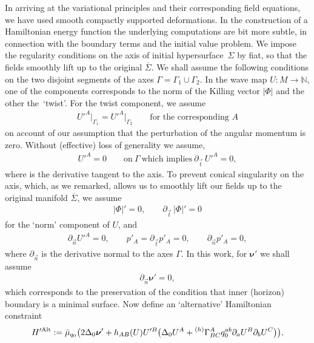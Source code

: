 \documentclass[11pt]{article}
\numberwithin{equation}{section}
\def\ptl{\partial}%
\def\mbo#1{\boldsymbol{#1}}%
\def\olin#1{\overline{#1}{}}%
\newcommand{\leftexp}[2]{{\vphantom{#2}}^{#1}{#2}}
\numberwithin{equation}{section}
\begin{document}
In arriving at the variational principles and their corresponding field equations, we have used smooth compactly supported deformations. In the construction of a Hamiltonian energy function the underlying computations are bit more subtle, in connection with the boundary terms and the initial value problem. We impose the regularity conditions on the axis of initial hypersurface~$\Sigma$ by fiat, so that the fields smoothly lift up to the original $\olin{\Sigma}$. We shall assume the following conditions on the two disjoint segments of the axes $\Gamma = \Gamma_1 \cup \Gamma_2$. In the wave map $U \colon M \to \mathbb{N}$, one of the components corresponds to the norm of the Killing vector $\vert \Phi \vert$ and the other the~`twist'. For the twist component, we assume
\begin{align*}
U'^A\big\vert_{\Gamma_1} = U'^A \big\vert_{\Gamma_2} \qquad \text{for the corresponding $A$}
\end{align*}
on account of our assumption that the perturbation of the angular momentum is zero. Without (effective) loss of generality we assume,
\begin{align*}
U'^A = 0 \qquad \text{on} \ \Gamma \ \text{which implies} \ \ptl_{\vec{t}}\, U'^A=0,
\end{align*}
where \smash{$\ptl_{\vec{t}}$} is the derivative tangent to the axis. To prevent conical singularity on the axis, which, as we remarked, allows us to smoothly lift our fields up to the original manifold $\olin{\Sigma}$, we assume
\begin{align*}
\vert \Phi \vert' =0, \qquad \ptl_{\vec{t}} \, \vert \Phi \vert' =0
\end{align*}
for the `norm' component of $U$, and
\begin{align*}
\ptl_{\vec{n}} U'^A =0, \qquad p'_A =\ptl_{\vec{t}} p'_A =0, \qquad \ptl_{\vec{n}} p'_A =0,
\end{align*}
where $\ptl_{\vec{n}}$ is the derivative normal to the axes $\Gamma$.
In this work, for $\mbo{\nu}'$ we shall assume
\begin{align*}
\ptl_{\vec{n}} \mbo{\nu}' =0,
\end{align*}
which corresponds to the preservation of the condition that inner (horizon) boundary is a minimal surface. Now define an `alternative' Hamiltonian constraint 
\begin{align*}
H'^{{\rm Alt}} := \bar{\mu}_{q_0} \bigl(2 \Delta_0 \mbo{\nu}' + h_{AB}(U) U'^B \bigl(\Delta_0 U^A + \leftexp{(h)}{\Gamma}^A_{BC} q^{ab}_0 \ptl_a U^B \ptl_b U^C\bigr)\bigr),
\end{align*}
\end{document}
